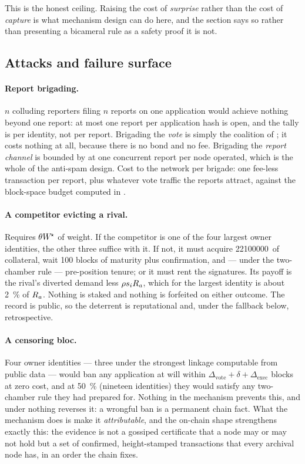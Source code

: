 This is the honest ceiling. Raising the cost of \emph{surprise} rather than the cost of
\emph{capture} is what mechanism design can do here, and the section says so rather than presenting
a bicameral rule as a safety proof it is not.

\subsection{Attacks and failure surface}
\label{sec:23:attacks}

\paragraph{Report brigading.} $n$ colluding reporters filing $n$ reports on one application would
achieve nothing beyond one report: at most one report per application hash is open, and the tally is
per identity, not per report. Brigading the \emph{vote} is simply the coalition of
; it costs nothing at all, because there is no bond and no fee. Brigading the
\emph{report channel} is bounded by  at one concurrent report per node
operated, which is the whole of the anti-spam design. Cost to the network per brigade: one fee-less
transaction per report, plus whatever vote traffic the reports attract, against the block-space
budget computed in .

\paragraph{A competitor evicting a rival.} Requires $\theta W^{\!\star}$ of weight. If the
competitor is one of the four largest owner identities, the other three suffice with it. If not, it
must acquire \num{22100000}\flux\ of collateral, wait 100 blocks of maturity plus confirmation,
and — under the two-chamber rule — pre-position tenure; or it must rent the signatures. Its payoff
is the rival's diverted demand less $\rho s_i R_{a}$, which for the largest identity is about
\SI{2}{\percent} of $R_{a}$. Nothing is staked and nothing is forfeited on either outcome. The
record is public, so the deterrent is reputational and, under the fallback below, retrospective.

\paragraph{A censoring bloc.} Four owner identities — three under the strongest linkage computable
from public data — would ban any application at will within
$\Delta_{\mathrm{vote}} + \delta + \Delta_{\mathrm{exec}}$ blocks at zero cost, and at
\SI{50}{\percent} (nineteen identities) they would satisfy any two-chamber rule they had prepared
for. Nothing in the mechanism prevents this, and under  nothing reverses
it: a wrongful ban is a permanent chain fact. What the mechanism does is make it
\emph{attributable}, and the on-chain shape strengthens exactly this: the evidence is not a
gossiped certificate that a node may or may not hold but a set of confirmed, height-stamped
transactions that every archival node has, in an order the chain fixes.

